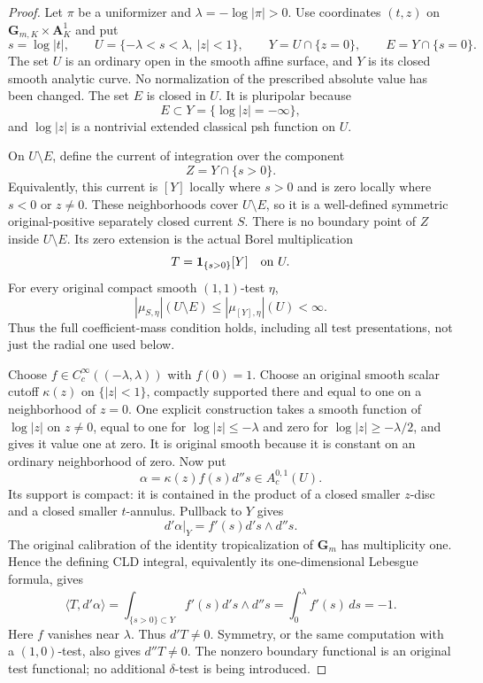 \documentclass[11pt,a4paper]{article}
\numberwithin{equation}{section}
\theoremstyle{definition}
\theoremstyle{remark}
\begin{document}
\begin{proof}
Let $\pi$ be a uniformizer and $\lambda=-\log|\pi|>0$. Use
coordinates $(t,z)$ on $\mathbf G_{m,K}\times\mathbf A^1_K$ and put
\[
 s=\log|t|,\qquad
 U=\{-\lambda<s<\lambda,\ |z|<1\},\qquad
 Y=U\cap\{z=0\},\qquad E=Y\cap\{s=0\}.
\]
The set $U$ is an ordinary open in the smooth affine surface,
and $Y$ is its closed smooth analytic curve. No normalization
of the prescribed absolute value has been changed.
The set $E$ is closed in $U$. It is pluripolar because
\[
 E\subset Y=\{\log|z|=-\infty\},
\]
and $\log|z|$ is a nontrivial extended classical psh function
on $U$.

On $U\setminus E$, define the current of integration over
the component
\[
 Z=Y\cap\{s>0\}.
\]
Equivalently, this current is $[Y]$ locally where $s>0$
and is zero locally where $s<0$ or $z\ne0$. These neighborhoods
cover $U\setminus E$, so it is a well-defined symmetric
original-positive separately closed current $S$.
There is no boundary point of $Z$ inside $U\setminus E$.
Its zero extension is the actual Borel multiplication
\[
 T=\mathbf1_{\{s>0\}}[Y]\quad\hbox{on }U.
\]
For every original compact smooth $(1,1)$-test $\eta$,
\[
 |\mu_{S,\eta}|(U\setminus E)
       \leq|\mu_{[Y],\eta}|(U)<\infty.
\]
Thus the full coefficient-mass condition holds, including all
test presentations, not just the radial one used below.

Choose $f\in C_c^\infty((-\lambda,\lambda))$ with $f(0)=1$.
Choose an original smooth scalar cutoff $\kappa(z)$ on
$\{|z|<1\}$, compactly supported there and equal to one on a
neighborhood of $z=0$. One explicit construction takes a
smooth function of $\log|z|$ on $z\ne0$, equal to one for
$\log|z|\leq-\lambda$ and zero for
$\log|z|\geq-\lambda/2$, and gives it value one at zero.
It is original smooth because it is constant on an ordinary
neighborhood of zero. Now put
\[
 \alpha=\kappa(z)f(s)d''s\in A_c^{0,1}(U).
\]
Its support is compact: it is contained in the product of a
closed smaller $z$-disc and a closed smaller $t$-annulus.
Pullback to $Y$ gives
\[
 d'\alpha|_Y=f'(s)d's\wedge d''s.
\]
The original calibration of the identity tropicalization of
$\mathbf G_m$ has multiplicity one. Hence the defining
CLD integral, equivalently its one-dimensional Lebesgue
formula, gives
\begin{equation}
\label{eq:r3-annular-boundary-current}
 \langle T,d'\alpha\rangle
   =\int_{\{s>0\}\subset Y}f'(s)d's\wedge d''s
   =\int_0^\lambda f'(s)\,ds=-1.
\end{equation}
Here $f$ vanishes near $\lambda$.
Thus $d'T\ne0$. Symmetry, or the same computation with a
$(1,0)$-test, also gives $d''T\ne0$. The nonzero boundary
functional is an original test functional; no additional
$\delta$-test is being introduced.


\end{proof}
\end{document}

